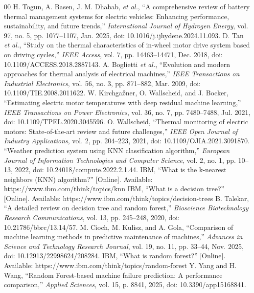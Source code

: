 \documentclass[conference]{IEEEtran}
\begin{document}
\begin{thebibliography}{00}
 H. Togun, A. Basen, J. M. Dhabab, \textit{et al.}, ``A comprehensive review of battery thermal management systems for electric vehicles: Enhancing performance, sustainability, and future trends,'' \textit{International Journal of Hydrogen Energy}, vol. 97, no. 5, pp. 1077--1107, Jan. 2025, doi: 10.1016/j.ijhydene.2024.11.093.
 D. Tan \textit{et al.}, ``Study on the thermal characteristics of in-wheel motor drive system based on driving cycles,'' \textit{IEEE Access}, vol. 7, pp. 14463--14471, Dec. 2018, doi: 10.1109/ACCESS.2018.2887143.
 A. Boglietti \textit{et al.}, ``Evolution and modern approaches for thermal analysis of electrical machines,'' \textit{IEEE Transactions on Industrial Electronics}, vol. 56, no. 3, pp. 871--882, Mar. 2009, doi: 10.1109/TIE.2008.2011622.
 W. Kirchga\ss{}ner, O. Wallscheid, and J. Bocker, ``Estimating electric motor temperatures with deep residual machine learning,'' \textit{IEEE Transactions on Power Electronics}, vol. 36, no. 7, pp. 7480--7488, Jul. 2021, doi: 10.1109/TPEL.2020.3045596.
 O. Wallscheid, ``Thermal monitoring of electric motors: State-of-the-art review and future challenges,'' \textit{IEEE Open Journal of Industry Applications}, vol. 2, pp. 204--223, 2021, doi: 10.1109/OJIA.2021.3091870.
 ``Weather prediction system using KNN classification algorithm,'' \textit{European Journal of Information Technologies and Computer Science}, vol. 2, no. 1, pp. 10--13, 2022, doi: 10.24018/compute.2022.2.1.44.
 IBM, ``What is the k-nearest neighbors (KNN) algorithm?'' [Online]. Available: https://www.ibm.com/think/topics/knn
 IBM, ``What is a decision tree?'' [Online]. Available: https://www.ibm.com/think/topics/decision-trees
 B. Talekar, ``A detailed review on decision tree and random forest,'' \textit{Bioscience Biotechnology Research Communications}, vol. 13, pp. 245--248, 2020, doi: 10.21786/bbrc/13.14/57.
 M. Cioch, M. Kulisz, and A. Gola, ``Comparison of machine learning methods in predictive maintenance of machines,'' \textit{Advances in Science and Technology Research Journal}, vol. 19, no. 11, pp. 33--44, Nov. 2025, doi: 10.12913/22998624/208284.
 IBM, ``What is random forest?'' [Online]. Available: https://www.ibm.com/think/topics/random-forest
 Y. Yang and H. Wang, ``Random Forest-based machine failure prediction: A performance comparison,'' \textit{Applied Sciences}, vol. 15, p. 8841, 2025, doi: 10.3390/app15168841.

\end{thebibliography}
\end{document}
